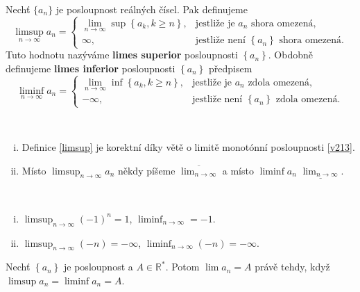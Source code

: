 \begin{definice}\label{limsup}
	Nechť $\{a_n\}$ je posloupnost reálných čísel. Pak definujeme
	$$
	    \limsup_{n\to \infty} a_n = \begin{cases}
			\lim_{n\to\infty} \sup \left \{ a_k, k \geq n \right \}, & \textrm{jestliže je } {a_n} \textrm{ shora omezená},\\
			\infty, & \textrm{jestliže není } \left \{ a_n \right \} \textrm{ shora omezená}.
		\end{cases}
	$$
	Tuto hodnotu nazýváme \textbf{limes superior} posloupnosti $\left \{ a_n \right \} $.
	Obdobně definujeme \textbf{limes inferior} posloupnosti $\left \{ a_n \right \} $ předpisem
	$$
	    \liminf_{n\to \infty} a_n = \begin{cases}
			\lim_{n\to\infty} \inf \left \{ a_k, k \geq n \right \}, & \textrm{jestliže je } {a_n} \textrm{ zdola omezená},\\
			-\infty, & \textrm{jestliže není } \left \{ a_n \right \} \textrm{ zdola omezená}.
		\end{cases}
	$$
\end{definice}

\begin{poznamka}\,
    \begin{enumerate}[(i)]
    	\item Definice \ref{limsup} je korektní díky větě o limitě monotónní posloupnosti \ref{v213}.
        \item Místo $\limsup_{n\to\infty} a_n$ někdy píšeme $\overline{\lim_{n\to\infty}}$ a místo $\liminf a_n$
        $\underline{\lim_{n\to\infty}}$.
    \end{enumerate}
\end{poznamka}

\begin{priklad}\,
\begin{enumerate}[(i)]
	\item $\limsup_{n\to\infty} (-1)^n = 1$, $\liminf_{n\to\infty} = -1$.
	\item $\limsup_{n\to\infty} (-n) = -\infty$, $\liminf_{n\to\infty} (-n) = -\infty$.
\end{enumerate}
\end{priklad}

\begin{veta}\label{veta2.15}
	Nechť $\left \{ a_n \right \}$ je posloupnost a $A\in \mathbb R ^*$. Potom
$\lim a_n = A$ právě tehdy, když $\limsup a_n = \liminf a_n = A$.
\end{veta}

